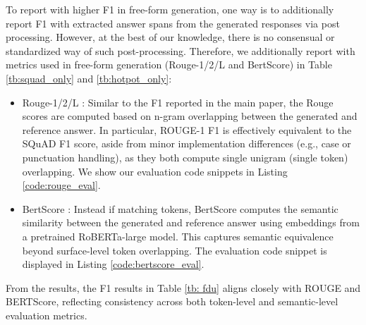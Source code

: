 \documentclass[11pt]{article}
\begin{document}
To report with higher F1 in free-form generation, one way is to additionally report F1 with extracted answer spans from the generated responses via post processing. However, at the best of our knowledge, there is no consensual or standardized way of such post-processing.
Therefore, we additionally report with metrics used in free-form generation (Rouge-1/2/L and BertScore) in Table \ref{tb:squad_only} and \ref{tb:hotpot_only}:

\begin{itemize}
    \item Rouge-1/2/L \cite{lin2004rouge}: Similar to the F1 reported in the main paper, the Rouge scores are computed based on n-gram overlapping between the generated and reference answer. 
    In particular, ROUGE-1 F1 is effectively equivalent to the SQuAD F1 score, aside from minor implementation differences (e.g., case or punctuation handling), as they both compute single unigram (single token) overlapping. We show our evaluation code snippets in Listing \ref{code:rouge_eval}.
    \item BertScore \cite{zhang2019bertscore}: Instead if matching tokens, BertScore computes the semantic similarity between the generated and reference answer using embeddings from a pretrained RoBERTa-large model. This captures semantic equivalence beyond surface-level token overlapping. The evaluation code snippet is displayed in Listing \ref{code:bertscore_eval}.
\end{itemize}

From the results, the F1 results in Table \ref{tb: fdu} aligns closely with ROUGE and BERTScore, reflecting consistency across both token-level and semantic-level evaluation metrics.

\end{document}
